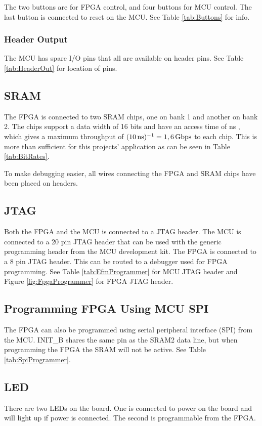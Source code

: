 The two buttons are for FPGA control, and four buttons for MCU control.
The last button is connected to reset on the MCU.
See Table \ref{tab:Buttons} for info.

\subsubsection{Header Output}
The MCU has spare I/O pins that all are available on header pins.
See Table \ref{tab:HeaderOut} for location of pins.

\subsection{SRAM}
\label{subsec:sram}
The FPGA is connected to two SRAM chips, one on bank 1 and another on bank 2.
The chips support a data width of 16 bits and have an access time of \unit[10]{ns} \cite{sramdatasheet}, which gives a maximum throughput of $(\unit[10]{ns})^{-1} = \unit[1,6]{Gbps}$ to each chip.
This is more than sufficient for this projects' application as can be seen in Table \ref{tab:BitRates}.

To make debugging easier, all wires connecting the FPGA and SRAM chips have been placed on headers. 

\subsection{JTAG}
Both the FPGA and the MCU is connected to a JTAG header.
The MCU is connected to a 20 pin JTAG header that can be used with the generic programming header from the MCU development kit.
The FPGA is connected to a 8 pin JTAG header.
This can be routed to a debugger used for FPGA programming.
See Table \ref{tab:EfmProgrammer} for MCU JTAG header and Figure \ref{fig:FpgaProgrammer} for FPGA JTAG header.

\subsection{Programming FPGA Using MCU SPI}
The FPGA can also be programmed using serial peripheral interface (SPI) from the MCU.
INIT\_B shares the same pin as the SRAM2 data line, but when programming the FPGA the SRAM will not be active.
See Table \ref{tab:SpiProgrammer}.

\subsection{LED}
There are two LEDs on the board.
One is connected to power on the board and will light up if power is connected.
The second is programmable from the FPGA.

